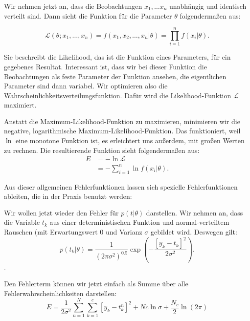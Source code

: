 Wir nehmen jetzt an, dass die Beobachtungen $x_1, \ldots x_n$ unabhängig und identisch verteilt sind. Dann sieht die Funktion für die Parameter $\theta$ folgendermaßen aus:

\begin{equation}
  \mathcal{L} (\theta; x_1, \ldots, x_n) =
  f(x_1, x_2, \ldots, x_n | \theta) =
  \prod_{i = 1}^n f(x_i|\theta) .
\end{equation}

Sie beschreibt die Likelihood, das ist die Funktion eines Parameters, für ein gegebenes Resultat. Interessant ist, dass wir bei dieser Funktion die Beobachtungen als feste Parameter der Funktion ansehen, die eigentlichen Parameter sind dann variabel. Wir optimieren also die Wahrscheinlichkeitsverteilungsfunktion. Dafür wird die Likelihood-Funktion $\mathcal{L}$ maximiert.

Anstatt die Maximum-Likelihood-Funktion zu maximieren, minimieren wir die negative, logarithmische Maximum-Likelihood-Funktion. Das funktioniert, weil $\ln$ eine monotone Funktion ist, es erleichtert uns außerdem, mit großen Werten zu rechnen. Die resultierende Funktion sieht folgendermaßen aus:
\begin{align}
 E  & = - \ln \mathcal{L} \\
  & = - \sum_{i=1}^n \ln f(x_i|\theta).
\end{align}

Aus dieser allgemeinen Fehlerfunktionen lassen sich spezielle Fehlerfunktionen ableiten, die in der Praxis benutzt werden\cite{bishop1995neural}:

Wir wollen jetzt wieder den Fehler für $p(t|\theta)$ darstellen. Wir nehmen an, dass die Variable $t_k$ aus einer deterministischen Funktion und normal-verteiltem Rauschen (mit Erwartungswert $0$ und Varianz $\sigma$ gebildet wird.  
Deswegen gilt: %
\begin{equation}
  p(t_k|\theta) = \frac{1}{(2 \pi \sigma^2)^{0.5}} \exp \left( -\frac{ \left[  y_k - t_k \right]^2 }{2 \sigma^2} \right).
\end{equation}.

Den Fehlerterm können wir jetzt einfach als Summe über alle Fehlerwahrscheinlichkeiten darstellen:
\begin{equation}
  E = \frac{1}{2 \sigma^2} \sum_{n=1}^{N} \sum_{k=1}^{c} \left[ y_k - t_k^n \right]^2 + Nc \ln \sigma + \frac{N_c}{2} \ln (2 \pi)
\end{equation}

